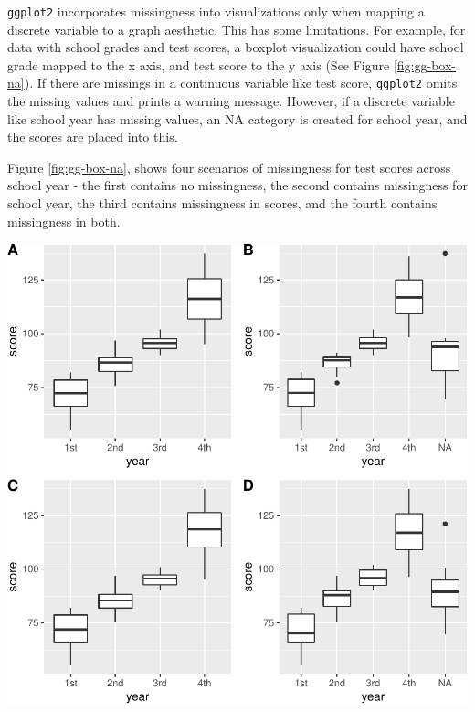 \documentclass[]{article}
\let\origfigure\figure
\let\endorigfigure\endfigure
\renewenvironment{figure}[1][2] {
    \expandafter\origfigure\expandafter[H]
} {
    \endorigfigure
}
\theoremstyle{definition}
\theoremstyle{definition}
\theoremstyle{definition}
\theoremstyle{remark}
\begin{document}
\texttt{ggplot2} incorporates missingness into visualizations only when
mapping a discrete variable to a graph aesthetic. This has some
limitations. For example, for data with school grades and test scores, a
boxplot visualization could have school grade mapped to the x axis, and
test score to the y axis (See Figure \ref{fig:gg-box-na}). If there are
missings in a continuous variable like test score, \texttt{ggplot2}
omits the missing values and prints a warning message. However, if a
discrete variable like school year has missing values, an NA category is
created for school year, and the scores are placed into this.

Figure \ref{fig:gg-box-na}, shows four scenarios of missingness for test
scores across school year - the first contains no missingness, the
second contains missingness for school year, the third contains
missingness in scores, and the fourth contains missingness in both.

\begin{figure}

{\centering \includegraphics[width=0.7\linewidth]{tidy-missing-data-paper_files/figure-latex/gg-box-na-1} 

}

\caption{ggplot2 provides different visualizations depending on what type of data has missing values. (A) Data is complete and graphic is presented; (B) Missings are only in category variable year - an additional 'NA' boxplot is created; (C) Missings only in scores, no additional missingness information is shown; (D) Missings in both scores and school year, additional missing information is shown. The missingness category is only shown when there are missings in categorical variables such as year (plots (B) and (D)). In (C), no missingness information is given on the graphic, despite there being missings in score, and a warning message is displayed about the number of missing values omitted.}\label{fig:gg-box-na}
\end{figure}
\end{document}
